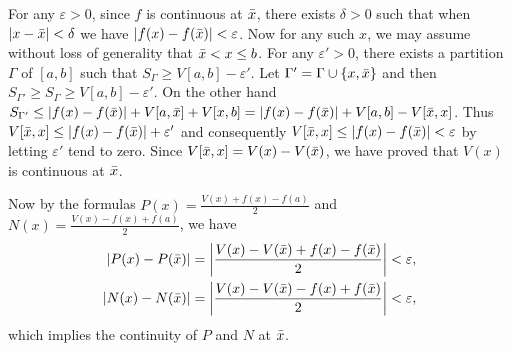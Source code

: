 \begin{exercise}{2.7}
  For any $\varepsilon>0$,
  since $f$ is continuous at $\Bar{x}$,
  there exists $\delta>0$ such that when $|x-\Bar{x}|<\delta$
  we have $|f(x)-f(\Bar{x})|<\varepsilon$.
  Now for any such $x$, we may assume without loss of generality that $\Bar{x}<x\leq b$.
  For any $\varepsilon'>0$,
  there exists a partition $\Gamma$ of $[a,b]$
  such that $S_{\Gamma}\geq V[a,b]-\varepsilon'$.
  Let $\Gamma'=\Gamma\cup \{x,\Bar{x}\}$ and then
  $S_{\Gamma'}\geq S_{\Gamma}\geq V[a,b]-\varepsilon'$.
  On the other hand
  $S_{\Gamma'}\leq |f(x)-f(\Bar{x})|+V[a,\Bar{x}]+V[x,b]=|f(x)-f(\Bar{x})|+V[a,b]-V[\Bar{x},x]$.
  Thus $V[\Bar{x},x]\leq |f(x)-f(\Bar{x})|+\varepsilon'$ and
  consequently $V[\Bar{x},x]\leq |f(x)-f(\Bar{x})|<\varepsilon$
  by letting $\varepsilon'$ tend to zero.
  Since $V[\Bar{x},x]=V(x)-V(\Bar{x})$,
  we have proved that $V(x)$ is continuous at $\Bar{x}$.

  Now by the formulas $P(x)=\frac{V(x)+f(x)-f(a)}{2}$ and $N(x)=\frac{V(x)-f(x)+f(a)}{2}$,
  we have
  \begin{align*}
    |P(x)-P(\Bar{x})|&=\bigg|\frac{V(x)-V(\Bar{x})+f(x)-f(\Bar{x})}{2}\bigg|<\varepsilon, \\
    |N(x)-N(\Bar{x})|&=\bigg|\frac{V(x)-V(\Bar{x})-f(x)+f(\Bar{x})}{2}\bigg|<\varepsilon, \\
  \end{align*}
  which implies the continuity of $P$ and $N$ at $\Bar{x}$.
\end{exercise}


